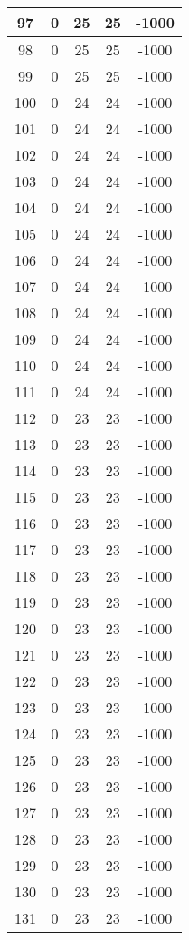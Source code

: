 \documentclass[letterpaper, 12pt]{article}
\begin{document}
\begin{longtable}{|c|c|c|c|c|}
\hline
97 & 0 & 25 & 25 & -1000 \\
\hline
98 & 0 & 25 & 25 & -1000 \\
\hline
99 & 0 & 25 & 25 & -1000 \\
\hline
100 & 0 & 24 & 24 & -1000 \\
\hline
101 & 0 & 24 & 24 & -1000 \\
\hline
102 & 0 & 24 & 24 & -1000 \\
\hline
103 & 0 & 24 & 24 & -1000 \\
\hline
104 & 0 & 24 & 24 & -1000 \\
\hline
105 & 0 & 24 & 24 & -1000 \\
\hline
106 & 0 & 24 & 24 & -1000 \\
\hline
107 & 0 & 24 & 24 & -1000 \\
\hline
108 & 0 & 24 & 24 & -1000 \\
\hline
109 & 0 & 24 & 24 & -1000 \\
\hline
110 & 0 & 24 & 24 & -1000 \\
\hline
111 & 0 & 24 & 24 & -1000 \\
\hline
112 & 0 & 23 & 23 & -1000 \\
\hline
113 & 0 & 23 & 23 & -1000 \\
\hline
114 & 0 & 23 & 23 & -1000 \\
\hline
115 & 0 & 23 & 23 & -1000 \\
\hline
116 & 0 & 23 & 23 & -1000 \\
\hline
117 & 0 & 23 & 23 & -1000 \\
\hline
118 & 0 & 23 & 23 & -1000 \\
\hline
119 & 0 & 23 & 23 & -1000 \\
\hline
120 & 0 & 23 & 23 & -1000 \\
\hline
121 & 0 & 23 & 23 & -1000 \\
\hline
122 & 0 & 23 & 23 & -1000 \\
\hline
123 & 0 & 23 & 23 & -1000 \\
\hline
124 & 0 & 23 & 23 & -1000 \\
\hline
125 & 0 & 23 & 23 & -1000 \\
\hline
126 & 0 & 23 & 23 & -1000 \\
\hline
127 & 0 & 23 & 23 & -1000 \\
\hline
128 & 0 & 23 & 23 & -1000 \\
\hline
129 & 0 & 23 & 23 & -1000 \\
\hline
130 & 0 & 23 & 23 & -1000 \\
\hline
131 & 0 & 23 & 23 & -1000 \\

\end{longtable}
\end{document}
